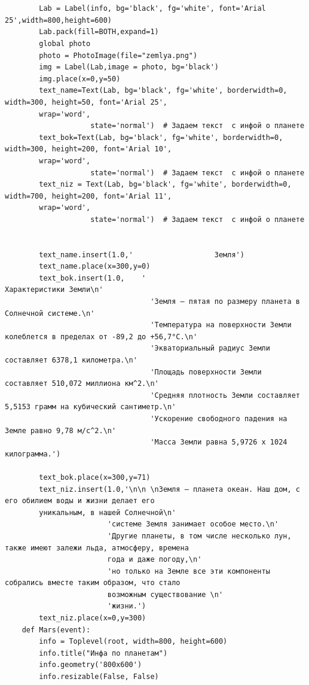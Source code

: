 \documentclass[11pt,a4paper]{report}
\begin{document}
\begin{verbatim}
        
    
        Lab = Label(info, bg='black', fg='white', font='Arial 25',width=800,height=600)  
        Lab.pack(fill=BOTH,expand=1)
        global photo
        photo = PhotoImage(file="zemlya.png")
        img = Label(Lab,image = photo, bg='black')
        img.place(x=0,y=50)
        text_name=Text(Lab, bg='black', fg='white', borderwidth=0, width=300, height=50, font='Arial 25', 
        wrap='word',
                    state='normal')  # Задаем текст  с инфой о планете
        text_bok=Text(Lab, bg='black', fg='white', borderwidth=0, width=300, height=200, font='Arial 10', 
        wrap='word',
                    state='normal')  # Задаем текст  с инфой о планете
        text_niz = Text(Lab, bg='black', fg='white', borderwidth=0, width=700, height=200, font='Arial 11', 
        wrap='word',
                    state='normal')  # Задаем текст  с инфой о планете
    
       
        text_name.insert(1.0,'                   Земля')
        text_name.place(x=300,y=0)
        text_bok.insert(1.0,    '                                           Характеристики Земли\n' 
                                  'Земля – пятая по размеру планета в Солнечной системе.\n'
                                  'Температура на поверхности Земли колеблется в пределах от -89,2 до +56,7°C.\n'
                                  'Экваториальный радиус Земли составляет 6378,1 километра.\n'
                                  'Площадь поверхности Земли составляет 510,072 миллиона км^2.\n'
                                  'Средняя плотность Земли составляет 5,5153 грамм на кубический сантиметр.\n'
                                  'Ускорение свободного падения на Земле равно 9,78 м/с^2.\n'
                                  'Масса Земли равна 5,9726 х 1024 килограмма.')    
        
        text_bok.place(x=300,y=71)        
        text_niz.insert(1.0,'\n\n \nЗемля — планета океан. Наш дом, с его обилием воды и жизни делает его 
        уникальным, в нашей Солнечной\n' 
                        'системе Земля занимает особое место.\n'
                        'Другие планеты, в том числе несколько лун, также имеют залежи льда, атмосферу, времена 
                        года и даже погоду,\n'
                        'но только на Земле все эти компоненты собрались вместе таким образом, что стало 
                        возможным существование \n' 
                        'жизни.')
        text_niz.place(x=0,y=300)
    def Mars(event):  
        info = Toplevel(root, width=800, height=600)
        info.title("Инфа по планетам")
        info.geometry('800x600')
        info.resizable(False, False)  
       

\end{verbatim}
\end{document}
